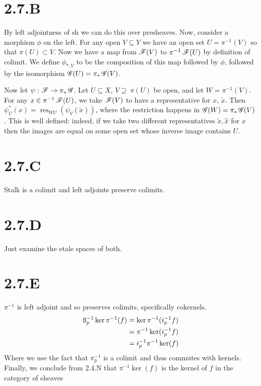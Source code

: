 \documentclass{article}
\begin{document}
\section*{2.7.B}
By left adjointness of $\text{sh}$ we can do this over presheaves.
Now, consider a morphism $\phi$ on the left. For any open
$V \subseteq Y$ we have an open set $U=\pi^{-1}(V)$ so that
$\pi(U) \subset V$. Now we have a map from $\operatorname{\mathscr{F}}(V)$ to
$\pi^{-1}\operatorname{\mathscr{F}}(U)$ by definition of colimit. We define
$\phi_{*,V}$ to be the composition of this map followed by
$\phi$, followed by the isomorphism $\operatorname{\mathscr{G}}(U)=\pi_*\operatorname{\mathscr{G}}(V)$.

Now let $\psi: \operatorname{\mathscr{F}} \to \pi_*\operatorname{\mathscr{G}}$. Let $U \subseteq X$,
$V \supseteq \ \pi(U)$ be open, and let $W=\pi^{-1}(V)$. For any
$x \in \pi^{-1}\operatorname{\mathscr{F}}(U)$, we take $\operatorname{\mathscr{F}}(V)$ to have a
representative for $x$, $\widetilde{x}$. Then
$\psi^*_U(x)=\operatorname{res}_{WU}(\psi_V(\widetilde{x}))$, where the restriction happens in
$\operatorname{\mathscr{G}}(W)=\pi_*\operatorname{\mathscr{G}}(V)$. This is well defined: indeed, if we take two different
representatives $\widetilde{x}, \widehat{x}$ for $x$ then the
images are equal on some open set whose inverse image contains
$U$.

\section*{2.7.C}
Stalk is a colimit and left adjoints preserve colimits.

\section*{2.7.D}
Just examine the etale spaces of both.

\section*{2.7.E}
$\pi^{-1}$ is left adjoint and so preserves colimits, specifically
cokernels.
\begin{align*}
    \i_p^{-1}\ker\pi^{-1}(f) & = \ker\pi^{-1}(i_p^{-1}f) \\
                             & = \pi^{-1}\ker(i_p^{-1}f) \\
                             & = i_p^{-1}\pi^{-1}\ker(f)
\end{align*}
Where we use the fact that $\pi^{-1}_p$ is a colimit and thus
commutes with kernels. Finally, we conclude from 2.4.N that
$\pi^{-1}\ker(f)$ is the kernel of $f$ in the
category of sheaves
\end{document}
